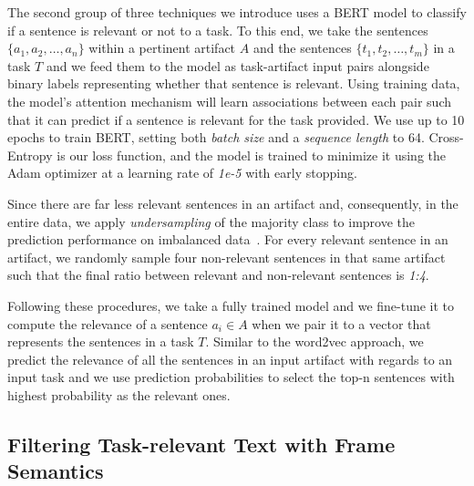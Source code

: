 The second group of three techniques we introduce uses a BERT model to classify if a sentence is relevant or not to a task.
To this end, we take the sentences $\{a_1, a_2, \dots, a_n\}$ within a pertinent artifact $A$ and the sentences $\{t_1, t_2, \dots, t_m\}$ in a task $T$ and we feed them to the model as task-artifact input pairs 
alongside binary labels representing whether that sentence is relevant. 
Using training data, the model's attention mechanism will learn associations between each pair such that it can predict if a sentence is relevant for the task provided. We use up to 10 epochs to train BERT, setting both \textit{batch size} and a \textit{sequence length} to 64. Cross-Entropy is our loss function, and the model is trained to minimize it using the Adam optimizer at a learning rate of \textit{1e-5} with early stopping. 


Since there are far less relevant sentences in an artifact and, consequently,
in the entire data, we apply \textit{undersampling} of the majority class 
to improve the prediction performance on imbalanced data~\cite{tan2015online}.
For every relevant sentence in an artifact, we randomly sample four 
non-relevant sentences in that same artifact such that the final ratio 
between relevant and non-relevant sentences is \textit{1:4}.





Following these procedures, we take a fully trained model and we fine-tune it to compute the relevance of a sentence $a_i \in A$ when we pair it to a vector that represents the sentences in a task $T$.
Similar to the word2vec approach, we predict the relevance of all the sentences in an input artifact with regards to an input task and we use prediction probabilities to select 
the top-n sentences with highest probability as the relevant ones.









\subsection{Filtering Task-relevant Text with Frame Semantics}
\label{cp5:approach-filters}


